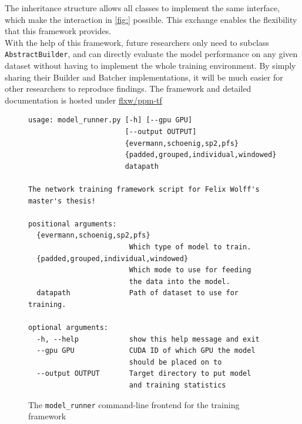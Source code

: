 The inheritance structure allows all classes to implement the same interface, which make the interaction in \autoref{fig:} possible. This exchange enables the flexibility that this framework provides.\\

With the help of this framework, future researchers only need to subclass \verb=AbstractBuilder=, and can directly evaluate the model performance on any given dataset without having to implement the whole training environment. By simply sharing their Builder and Batcher implementations, it will be much easier for other researchers to reproduce findings. The framework and detailed documentation is hosted under \href{https://github.com/flxw/ppm-tf}{flxw/ppm-tf}

\begin{figure}
\centering
\begin{verbatim}
usage: model_runner.py [-h] [--gpu GPU]
                       [--output OUTPUT]
                       {evermann,schoenig,sp2,pfs}
                       {padded,grouped,individual,windowed}
                       datapath

The network training framework script for Felix Wolff's master's thesis!

positional arguments:
  {evermann,schoenig,sp2,pfs}
                        Which type of model to train.
  {padded,grouped,individual,windowed}
                        Which mode to use for feeding
                        the data into the model.
  datapath              Path of dataset to use for training.

optional arguments:
  -h, --help            show this help message and exit
  --gpu GPU             CUDA ID of which GPU the model
                        should be placed on to
  --output OUTPUT       Target directory to put model
                        and training statistics
\end{verbatim}
\caption[CLI frontend for the framework]{The \texttt{model\_runner} command-line frontend for the training framework}
\label{fig:framework-frontend}
\end{figure}
